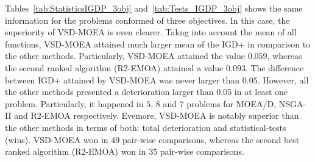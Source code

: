 Tables~\ref{tab:StatisticsIGDP_3obj} and~\ref{tab:Tests_IGDP_3obj} shows the same information for the problems conformed of three objectives.
%
In this case, the superiority of VSD-MOEA is even clearer.
%
Takng into account the mean of all functions, VSD-MOEA attained much larger mean of the IGD+ in comparison to the other methods.
%
Particularly, VSD-MOEA attained the value $0.059$, whereas the second ranked algorithm (R2-EMOA) attained a value $0.093$.
%
The difference between IGD+ attained by VSD-MOEA was never larger than $0.05$.
%
However, all the other methods presented a deterioration larger than $0.05$ in at least one problem.
%
Particularly, it happened in $5$, $8$ and $7$ problems for MOEA/D, NSGA-II and R2-EMOA respectively.
%
Evemore, VSD-MOEA is notably superior than the other methods in terms of both: total deterioration and statistical-tests (wins).
%
VSD-MOEA won in $49$ pair-wise comparisons, whereas the second best ranked algorithm (R2-EMOA) won in $35$ pair-wise comparisons.







